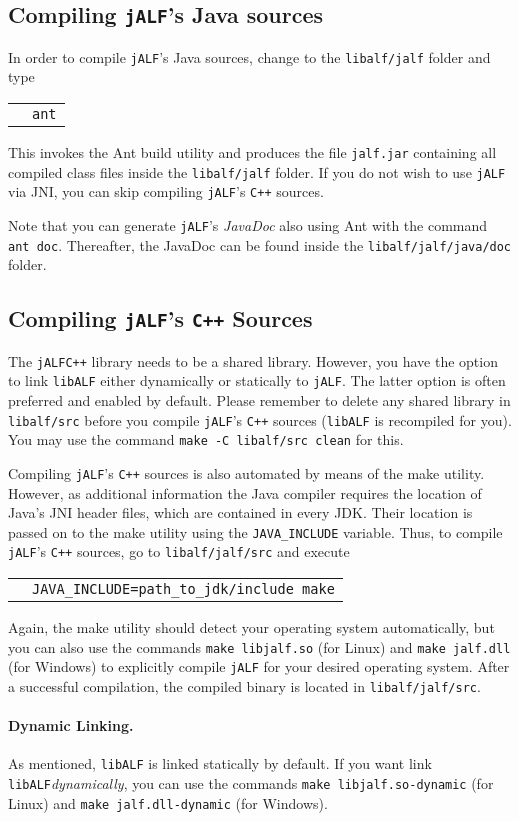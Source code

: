 \documentclass[a4paper, fontsize=11pt, DIV=12, parskip=half]{scrartcl}
\newcommand{\libalf}{\texttt{libALF}\xspace}
\newcommand{\jalf}{\texttt{jALF}\xspace}
\newcommand{\cpp}{\texttt{C+$\!$+}\xspace}
\newcommand{\cmd}[1]{
\begin{tabular}{p{.025\textwidth}l}
&\begin{minipage}{.85\textwidth}\texttt{#1}\end{minipage}
\end{tabular}
}
\begin{document}
\subsection{Compiling \jalf's Java sources}
In order to compile \jalf's Java sources, change to the \texttt{libalf/jalf} folder and type

\cmd{ant}

This invokes the Ant build utility and produces the file \texttt{jalf.jar} containing all compiled class files inside the \texttt{libalf/jalf} folder. If you do not wish to use \jalf via JNI, you can skip compiling \jalf's \cpp sources.

Note that you can generate \jalf's \emph{JavaDoc} also using Ant with the command \texttt{ant doc}. Thereafter, the JavaDoc can be found inside the \texttt{libalf/jalf/java/doc} folder.

\subsection{\texorpdfstring{Compiling \jalf's \cpp Sources}{Compiling jALF's C++ Sources}}
The \jalf \cpp library needs to be a shared library. However, you have the option to link \libalf either dynamically or statically to \jalf. The latter option is often preferred and enabled by default. Please remember to delete any shared library in \texttt{libalf/src} before you compile \jalf's \cpp sources (\libalf is recompiled for you). You may use the command \texttt{make -C libalf/src clean} for this.

Compiling \jalf's \cpp sources is also automated by means of the make utility. However, as additional information the Java compiler requires the location of Java's JNI header files, which are contained in every JDK. Their location is passed on to the make utility using the \texttt{JAVA\_INCLUDE} variable. Thus, to compile \jalf's \cpp sources, go to \texttt{libalf/jalf/src} and execute

\cmd{JAVA\_INCLUDE=path\_to\_jdk/include make}

Again, the make utility should detect your operating system automatically, but you can also use the commands \texttt{make libjalf.so} (for Linux) and \texttt{make jalf.dll} (for Windows) to explicitly compile \jalf for your desired operating system. After a successful compilation, the compiled binary is located in \texttt{libalf/jalf/src}.

\paragraph{Dynamic Linking.}
As mentioned, \libalf is linked statically by default. If you want link \libalf \emph{dynamically}, you can use the commands \texttt{make libjalf.so-dynamic} (for Linux) and \texttt{make jalf.dll-dynamic} (for Windows).
\end{document}

